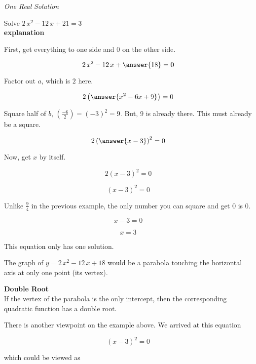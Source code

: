 \documentclass{ximera}
\begin{document}
\begin{example} \textit{One Real Solution}

Solve $2 \, x^2 - 12 \, x + 21 = 3$ \\


\textbf{explanation}


First, get everything to one side and $0$ on the other side.



\[  2 \, x^2 - 12 \, x + \answer{18} = 0  \]

Factor out $a$, which is $2$ here.

\[  2 \left( \answer{x^2 - 6x + 9} \right) = 0  \]


Square half of $b$, $\left(\frac{-6}{2}\right) = (-3)^2 = 9$.  But, $9$ is already there.  This must already be a square.



\[  2 \left( \answer{x - 3} \right)^2 = 0  \]


Now, get $x$ by itself.

\[  2 (x - 3)^2 = 0  \]

\[  (x - 3)^2 = 0  \]


Unlike $\frac{9}{4}$ in the previous example, the only number you can square and get $0$ is $0$.

\[  x - 3 = 0  \]

\[  x = 3  \]


This equation only has one solution.



\end{example}



The graph of $y = 2 \, x^2 - 12\, x + 18$ would be a parabola touching the horizontal axis at only one point (its vertex).




\begin{idea} \textbf{\textcolor{red!80!black}{Double Root}} \\

If the vertex of the parabola is the only intercept, then the corresponding quadratic function has a double root.


\end{idea}



There is another viewpoint on the example above.  We arrived at this equation

\[  (x - 3)^2 = 0  \]

which could be viewed as 
\end{document}
